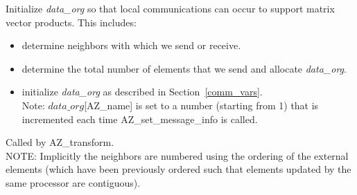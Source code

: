 \vspace{2em}
{ \hrulefill}
\vspace{1em}

Initialize {\it data\_org\/} so that local communications can occur to support
matrix vector products. This includes:
\begin{itemize}
\item determine neighbors with which we send or receive.
\item determine the total number of elements that we send and allocate {\it
    data\_org\/}.
\item initialize {\it data\_org\/} as described in
  Section~\ref{comm_vars}.\\Note: $data\_org$[{\sf AZ\_name}] is set to a
  number (starting from 1) that is incremented each time {\sf
    AZ\_set\_message\_info} is called.
\end{itemize}
Called by {\sf AZ\_transform}.\\
NOTE: Implicitly the neighbors are numbered using the ordering of the external
elements (which have been previously ordered such that elements updated by the
same processor are contiguous).

\vspace{2em}
{ \hrulefill}
\vspace{1em}



%

\vspace{2em}
{ \hrulefill}
\vspace{1em}


